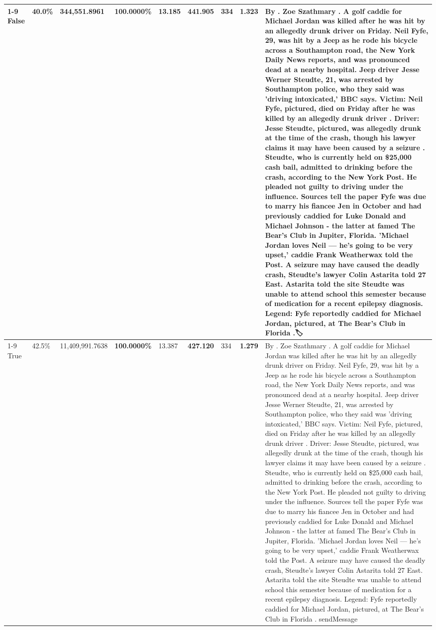 \begin{table}[H]
\begin{tabular}{lllrlllll}
\cline{1-9}
False & 40.0\% & 344,551.8961 & \bfseries \color{red} 100.0000\% & 13.185 & 441.905 & 334 & 1.323 & By . Zoe Szathmary . A golf caddie for Michael Jordan was killed after he was hit by an allegedly drunk driver on Friday. Neil Fyfe, 29, was hit by a Jeep as he rode his bicycle across a Southampton road, the New York Daily News reports, and was pronounced dead at a nearby hospital. Jeep driver Jesse Werner Steudte, 21, was arrested by Southampton police, who they said was 'driving intoxicated,' BBC says. Victim: Neil Fyfe, pictured, died on Friday after he was killed by an allegedly drunk driver . Driver: Jesse Steudte, pictured, was allegedly drunk at the time of the crash, though his lawyer claims it may have been caused by a seizure . Steudte, who is currently held on \$25,000 cash bail, admitted to drinking before the crash, according to the New York Post. He pleaded not guilty to driving under the influence. Sources tell the paper Fyfe was due to marry his fiancee Jen in October and had previously caddied for Luke Donald and Michael Johnson - the latter at famed The Bear's Club in Jupiter, Florida. 'Michael Jordan loves Neil — he’s going to be very upset,' caddie Frank Weatherwax told the Post. A seizure may have caused the deadly crash, Steudte's lawyer Colin Astarita told 27 East. Astarita told the site Steudte was unable to attend school this semester because of medication for a recent epilepsy diagnosis. Legend: Fyfe reportedly caddied for Michael Jordan, pictured, at The Bear's Club in Florida .🏷 \\
\cline{1-9}
True & 42.5\% & 11,409,991.7638 & \bfseries \color{red} 100.0000\% & 13.387 & \bfseries \color{red} 427.120 & 334 & \bfseries \color{red} 1.279 & By . Zoe Szathmary . A golf caddie for Michael Jordan was killed after he was hit by an allegedly drunk driver on Friday. Neil Fyfe, 29, was hit by a Jeep as he rode his bicycle across a Southampton road, the New York Daily News reports, and was pronounced dead at a nearby hospital. Jeep driver Jesse Werner Steudte, 21, was arrested by Southampton police, who they said was 'driving intoxicated,' BBC says. Victim: Neil Fyfe, pictured, died on Friday after he was killed by an allegedly drunk driver . Driver: Jesse Steudte, pictured, was allegedly drunk at the time of the crash, though his lawyer claims it may have been caused by a seizure . Steudte, who is currently held on \$25,000 cash bail, admitted to drinking before the crash, according to the New York Post. He pleaded not guilty to driving under the influence. Sources tell the paper Fyfe was due to marry his fiancee Jen in October and had previously caddied for Luke Donald and Michael Johnson - the latter at famed The Bear's Club in Jupiter, Florida. 'Michael Jordan loves Neil — he’s going to be very upset,' caddie Frank Weatherwax told the Post. A seizure may have caused the deadly crash, Steudte's lawyer Colin Astarita told 27 East. Astarita told the site Steudte was unable to attend school this semester because of medication for a recent epilepsy diagnosis. Legend: Fyfe reportedly caddied for Michael Jordan, pictured, at The Bear's Club in Florida . sendMessage \\

\end{tabular}
\end{table}
